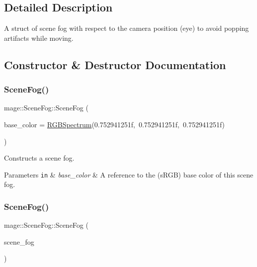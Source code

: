 \subsection{Detailed Description}
A struct of scene fog with respect to the camera position (eye) to avoid popping artifacts while moving. 

\subsection{Constructor \& Destructor Documentation}
\hypertarget{classmage_1_1_scene_fog_ab7504dee23779a9a6fd89cf446a5dc31}{}\label{classmage_1_1_scene_fog_ab7504dee23779a9a6fd89cf446a5dc31} 
\subsubsection{\texorpdfstring{Scene\+Fog()}{SceneFog()}\hspace{0.1cm}{\footnotesize\ttfamily [1/3]}}
{\footnotesize\ttfamily mage\+::\+Scene\+Fog\+::\+Scene\+Fog (\begin{DoxyParamCaption}\item[{const \hyperlink{structmage_1_1_r_g_b_spectrum}{R\+G\+B\+Spectrum} \&}]{base\+\_\+color = {\ttfamily \hyperlink{structmage_1_1_r_g_b_spectrum}{R\+G\+B\+Spectrum}(0.752941251f,~0.752941251f,~0.752941251f)} }\end{DoxyParamCaption})\hspace{0.3cm}{\ttfamily [explicit]}}

Constructs a scene fog.


\begin{DoxyParams}[1]{Parameters}
\mbox{\tt in}  & {\em base\+\_\+color} & A reference to the (s\+R\+GB) base color of this scene fog. \\
\hline
\end{DoxyParams}
\hypertarget{classmage_1_1_scene_fog_a203934b340b718f9b6f136100df62268}{}\label{classmage_1_1_scene_fog_a203934b340b718f9b6f136100df62268} 
\subsubsection{\texorpdfstring{Scene\+Fog()}{SceneFog()}\hspace{0.1cm}{\footnotesize\ttfamily [2/3]}}
{\footnotesize\ttfamily mage\+::\+Scene\+Fog\+::\+Scene\+Fog (\begin{DoxyParamCaption}\item[{const \hyperlink{classmage_1_1_scene_fog}{Scene\+Fog} \&}]{scene\+\_\+fog }\end{DoxyParamCaption})\hspace{0.3cm}{\ttfamily [default]}}

